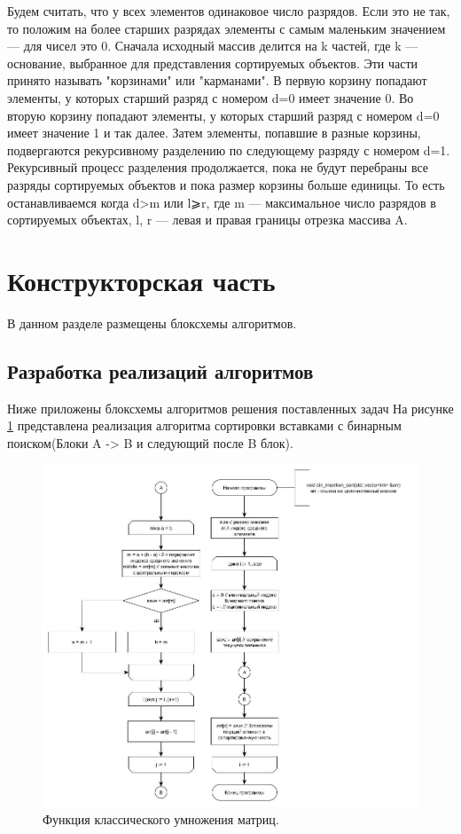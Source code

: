 \documentclass[a4paper, 14pt]{article}
\begin{document}
Будем считать, что у всех элементов одинаковое число разрядов. Если это не так, то положим на более старших разрядах элементы с самым маленьким значением — для чисел это 0. Сначала исходный массив делится на k частей, где k — основание, выбранное для представления сортируемых объектов. Эти части принято называть "корзинами" или "карманами". В первую корзину попадают элементы, у которых старший разряд с номером d=0 имеет значение 0. Во вторую корзину попадают элементы, у которых старший разряд с номером d=0 имеет значение 1 и так далее. Затем элементы, попавшие в разные корзины, подвергаются рекурсивному разделению по следующему разряду с номером d=1. Рекурсивный процесс разделения продолжается, пока не будут перебраны все разряды сортируемых объектов и пока размер корзины больше единицы. То есть останавливаемся когда d>m или l⩾r, где m — максимальное число разрядов в сортируемых объектах, l, r — левая и правая границы отрезка массива A.
	
		\newpage
	\section{Конструкторская часть}
	\hspace{1cm}В данном разделе размещены блоксхемы алгоритмов.
	\subsection{Разработка реализаций алгоритмов}
	
	\hspace{1cm}Ниже приложены блоксхемы алгоритмов решения поставленных задач
На рисунке \ref{ris:bin_insertion} представлена реализация алгоритма сортировки вставками с бинарным поиском(Блоки A -> B и следующий после B блок).

\begin{figure}[h]
\center
\includegraphics[scale=0.5]{bin_insertion.jpg}
\caption{Функция классического умножения матриц.}
\label{ris:bin_insertion}
\end{figure}
\end{document}
